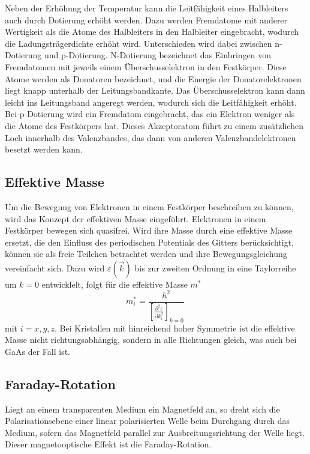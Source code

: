 Neben der Erhöhung der Temperatur kann die Leitfähigkeit eines Halbleiters auch durch Dotierung erhöht werden. Dazu 
werden Fremdatome mit anderer Wertigkeit als die Atome des Halbleiters in den Halbleiter eingebracht, wodurch die 
Ladungsträgerdichte erhöht wird. Unterschieden wird dabei zwischen n-Dotierung und p-Dotierung.
N-Dotierung bezeichnet das Einbringen von Fremdatomen mit jeweils einem Überschusselektron in den Festkörper. Diese Atome 
werden als Donatoren bezeichnet, und die Energie der Donatorelektronen liegt knapp unterhalb der Leitungsbandkante. Das Überschusselektron 
kann dann leicht ins Leitungsband angeregt werden, wodurch sich die Leitfähigkeit erhöht. 
Bei p-Dotierung wird ein Fremdatom eingebracht, das ein Elektron weniger als die Atome des Festkörpers hat. Dieses Akzeptoratom
führt zu einem zusätzlichen Loch innerhalb des Valenzbandes, das dann von anderen Valenzbandelektronen besetzt werden kann.

\subsection{Effektive Masse}
Um die Bewegung von Elektronen in einem Festkörper beschreiben zu können, wird das Konzept der effektiven Masse eingeführt.
Elektronen in einem Festkörper bewegen sich quasifrei. Wird ihre Masse durch eine effektive Masse ersetzt, die den 
Einfluss des periodischen Potentials des Gitters berücksichtigt, können sie als freie Teilchen betrachtet werden und 
ihre Bewegungsgleichung vereinfacht sich. Dazu wird $\varepsilon(\vec{k})$ bis zur zweiten Ordnung in eine
Taylorreihe um $k = 0$ entwicklelt, folgt für die effektive Masse $m^{*}$
\begin{equation*}
    m^{*}_i = \frac{\hbar^2}{\left[\frac{\partial^2 \varepsilon}{\partial k_i^2}\right]_{k = 0}} \, 
\end{equation*}
mit $i = x, y, z$.
Bei Kristallen mit hinreichend hoher Symmetrie ist die effektive Masse nicht richtungsabhängig, 
sondern in alle Richtungen gleich, was auch bei GaAs der Fall ist. 

\subsection{Faraday-Rotation}
Liegt an einem transparenten Medium ein Magnetfeld an, so dreht
sich die Polarisationsebene einer linear polarisierten Welle beim Durchgang durch das Medium, sofern das Magnetfeld
parallel zur Ausbreitungsrichtung der Welle liegt. Dieser magnetooptische Effekt ist die Faraday-Rotation.

